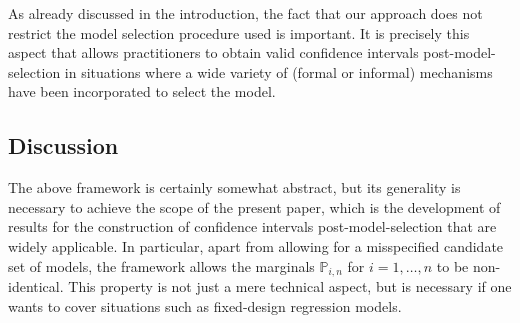 \documentclass[preprint]{imsart}
\renewcommand{\P}{{\mathbb P}}
\numberwithin{equation}{section}
\begin{document}
As already discussed in the introduction, the fact that our approach does not restrict the model selection procedure used is important. It is precisely this aspect that allows practitioners to obtain valid confidence intervals post-model-selection in situations where a wide variety of (formal or informal) mechanisms have been incorporated to select the model. 


\subsection{Discussion} \label{ssc:discfram}
The above framework is certainly somewhat abstract, but its generality is necessary to achieve the scope of the present paper, which is the development of results for the construction of confidence intervals post-model-selection that are widely applicable. In particular, apart from allowing for a misspecified candidate set of models, the framework allows the marginals $\P_{i,n}$ for $i = 1, \hdots, n$ to be non-identical. This property is not just a mere technical aspect, but is necessary if one wants to cover situations such as fixed-design regression models. 
\end{document}
